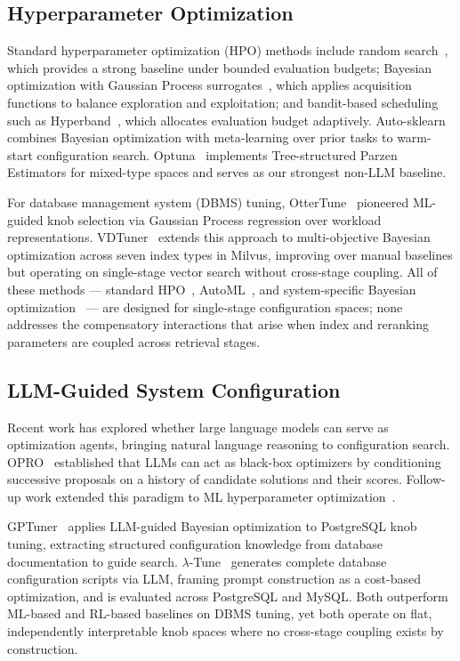 \documentclass[sigconf, nonacm]{acmart}
\theoremstyle{definition}
\begin{document}
\subsection{Hyperparameter Optimization}
Standard hyperparameter optimization (HPO) methods include random search~\cite{bergstra2012random}, which provides a
strong baseline under bounded evaluation budgets; Bayesian optimization with Gaussian
Process surrogates~\cite{snoek2012bayesian}, which applies acquisition functions to
balance exploration and exploitation; and bandit-based scheduling such as
Hyperband~\cite{li2018hyperband}, which allocates evaluation budget adaptively.
Auto-sklearn~\cite{feurer2015autosklearn} combines Bayesian optimization with
meta-learning over prior tasks to warm-start configuration search.
Optuna~\cite{akiba2019optuna} implements Tree-structured Parzen Estimators for
mixed-type spaces and serves as our strongest non-LLM baseline.

For database management system (DBMS) tuning, OtterTune~\cite{vanaken2017ottertune} pioneered ML-guided knob
selection via Gaussian Process regression over workload representations.
VDTuner~\cite{yang2024vdtuner} extends this approach to multi-objective Bayesian
optimization across seven index types in Milvus, improving over manual baselines but
operating on single-stage vector search without cross-stage coupling.
All of these methods --- standard HPO~\cite{bergstra2012random,snoek2012bayesian,li2018hyperband,akiba2019optuna}, AutoML~\cite{feurer2015autosklearn}, and system-specific Bayesian optimization~\cite{vanaken2017ottertune,yang2024vdtuner}
--- are designed for single-stage configuration spaces; none addresses the compensatory
interactions that arise when index and reranking parameters are coupled across retrieval stages.

\subsection{LLM-Guided System Configuration}
Recent work has explored whether large language models can serve as optimization agents, bringing natural language reasoning to configuration search.
OPRO~\cite{yang2024opro} established that LLMs can act as black-box optimizers by
conditioning successive proposals on a history of candidate solutions and their scores.
Follow-up work extended this paradigm to ML hyperparameter
optimization~\cite{zhang2023llmhyperopt,liu2024agenthpo}.

GPTuner~\cite{lao2024gpttuner} applies LLM-guided Bayesian optimization to PostgreSQL
knob tuning, extracting structured configuration knowledge from database documentation
to guide search.
$\lambda$-Tune~\cite{giannakouris2025lambdatune} generates complete database
configuration scripts via LLM, framing prompt construction as a cost-based optimization,
and is evaluated across PostgreSQL and MySQL.
Both outperform ML-based and RL-based baselines on DBMS tuning, yet both operate on
flat, independently interpretable knob spaces where no cross-stage coupling exists by
construction.
\end{document}
